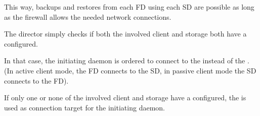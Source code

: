 This way, backups and restores from each FD using each SD are possible
as long as the firewall allows the needed network connections.

The director simply checks if both the involved client and storage
both have a  configured.

In that case, the initiating daemon is ordered to connect to the 
instead of the . (In active client mode, the FD connects to the SD, in
passive client mode the SD connects to the FD).

If only one or none of the involved client and storage have a 
configured, the  is used as connection target for the
initiating daemon.
